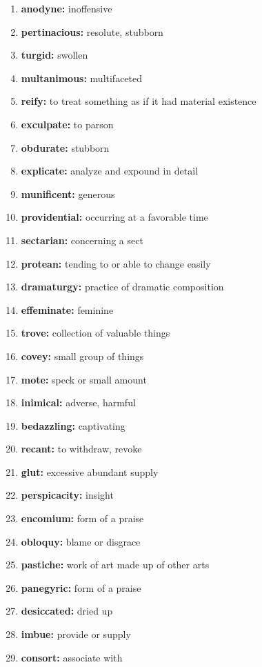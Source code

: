 \documentclass{article}
\begin{document}
\begin{enumerate}
    \item \textbf{anodyne: }{inoffensive}
    \item \textbf{pertinacious: }{resolute, stubborn}
    \item \textbf{turgid: }{swollen}
    \item \textbf{multanimous: }{multifaceted}
    \item \textbf{reify: }{to treat something as if it had material existence}
    \item \textbf{exculpate: }{to parson}
    \item \textbf{obdurate: }{stubborn}
    \item \textbf{explicate: }{analyze and expound in detail}
    \item \textbf{munificent: }{generous}
    \item \textbf{providential: }{occurring at a favorable time}
    \item \textbf{sectarian: }{concerning a sect}
    \item \textbf{protean: }{tending to or able to change easily}
    \item \textbf{dramaturgy: }{practice of dramatic composition}
    \item \textbf{effeminate: }{feminine}
    \item \textbf{trove: }{collection of valuable things}
    \item \textbf{covey: }{small group of things}
    \item \textbf{mote: }{speck or small amount}
    \item \textbf{inimical: }{adverse, harmful}
    \item \textbf{bedazzling: }{captivating}
    \item \textbf{recant: }{to withdraw, revoke}
    \item \textbf{glut: }{excessive abundant supply}
    \item \textbf{perspicacity: }{insight}
    \item \textbf{encomium: }{form of a praise}
    \item \textbf{obloquy: }{blame or disgrace}
    \item \textbf{pastiche: }{work of art made up of other arts}
    \item \textbf{panegyric: }{form of a praise}
    \item \textbf{desiccated: }{dried up}
    \item \textbf{imbue: }{provide or supply}
    \item \textbf{consort: }{associate with}

\end{enumerate}
\end{document}
